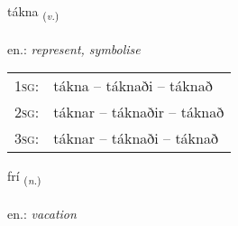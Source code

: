 \documentclass[frontgrid, backgrid]{flacards}\usepackage[]{graphicx}\usepackage[]{xcolor}
\begin{document}
\renewcommand{\blhead}{\vskip5pt {\small\bfseries\footnotesize Sagnorð | Verb }}
\renewcommand{\bcfoot}{\vskip5pt \hspace{2pt}{\small\bfseries\footnotesize 2K}}


{tákna \small{\textsubscript{(\textit{v.})}} \\[1ex] %
\textphonetic{[tʰauhkna]} \\
en.: \emph{represent, symbolise} \\  [2ex]
\renewcommand*{\arraystretch}{0.8}
\begin{tabular}{p{1cm}l}
\textsc{1sg}: & tákna -- táknaði -- táknað \\ 
\textsc{2sg}: & táknar -- táknaðir -- táknað \\ 
\textsc{3sg}: & táknar -- táknaði -- táknað \\ 
\end{tabular}
}

\renewcommand{\flhead}{\vskip5pt \fboxsep=0pt {\small\bfseries\footnotesize Nafnorð | Noun}}
\renewcommand{\fcfoot}{\vskip5pt \fboxsep=0pt \hspace{2pt}{\small\bfseries\footnotesize 2K}}

\renewcommand{\blhead}{\vskip5pt {\small\bfseries\footnotesize Nafnorð | Noun }}
\renewcommand{\bcfoot}{\vskip5pt \hspace{2pt}{\small\bfseries\footnotesize 2K}}


{frí \small{\textsubscript{(\textit{n.})}} \\[1ex] %
\textphonetic{[friː]} \\
en.: \emph{vacation} \\  [2ex]
\renewcommand*{\arraystretch}{0.8}
}

\renewcommand{\flhead}{\vskip5pt \fboxsep=0pt {\small\bfseries\footnotesize Sagnorð | Verb}}
\renewcommand{\fcfoot}{\vskip5pt \fboxsep=0pt \hspace{2pt}{\small\bfseries\footnotesize 2K}}
\end{document}
